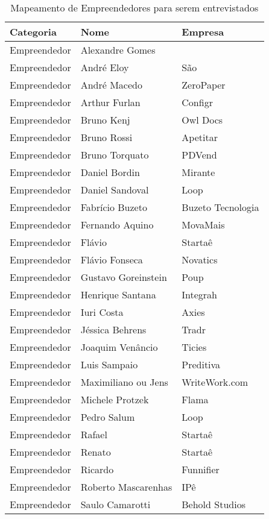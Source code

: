 \begin{table}[!htb]
	\centering
	\label{tabela:sugestao_de_empreendedores_para_entrevista}
	\begin{tabular}{ | p{3cm} | p{8cm} | p{4cm} | }
		\hline
		Categoria & Nome & Empresa \\ \hline
		Empreendedor & Alexandre Gomes & \\ \hline
		Empreendedor & André Eloy & São \\ \hline
		Empreendedor & André Macedo & ZeroPaper \\ \hline
		Empreendedor & Arthur Furlan & Configr \\ \hline
		Empreendedor & Bruno Kenj & Owl Docs \\ \hline
		Empreendedor & Bruno Rossi & Apetitar \\ \hline
		Empreendedor & Bruno Torquato & PDVend \\ \hline
		Empreendedor & Daniel Bordin & Mirante  \\ \hline
		Empreendedor & Daniel Sandoval & Loop \\ \hline
		Empreendedor & Fabrício Buzeto & Buzeto Tecnologia \\ \hline
		Empreendedor & Fernando Aquino & MovaMais \\ \hline
		Empreendedor & Flávio & Startaê \\ \hline	
		Empreendedor & Flávio Fonseca & Novatics \\ \hline
		Empreendedor & Gustavo Goreinstein & Poup \\ \hline	
		Empreendedor & Henrique Santana & Integrah \\ \hline
		Empreendedor & Iuri Costa & Axies \\ \hline
		Empreendedor & Jéssica Behrens & Tradr \\ \hline
		Empreendedor & Joaquim Venâncio & Ticies \\ \hline
		Empreendedor & Luis Sampaio & Preditiva  \\ \hline
		Empreendedor & Maximiliano ou Jens & WriteWork.com \\ \hline
		Empreendedor & Michele Protzek & Flama \\ \hline
		Empreendedor & Pedro Salum & Loop \\ \hline
		Empreendedor & Rafael & Startaê \\ \hline	
		Empreendedor & Renato & Startaê \\ \hline	
		Empreendedor & Ricardo & Funnifier \\ \hline
		Empreendedor & Roberto Mascarenhas & IPê \\ \hline
		Empreendedor & Saulo Camarotti & Behold Studios \\ \hline	
	\end{tabular}
	\caption{Mapeamento de Empreendedores para serem entrevistados}
\end{table}

